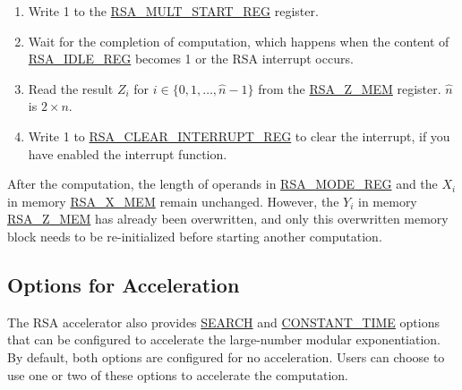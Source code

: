 \documentclass[main\_\_EN.tex]{subfiles}
\begin{document}
\begin{enumerate}
        Users need to write data to each memory block only according to the length of the number; data beyond this length are ignored.
        
    \item Write 1 to the \hyperref[regdesc:RSAMULTSTARTREG]{RSA\_MULT\_START\_REG} register.

    \item Wait for the completion of computation, which happens when the content of \hyperref[regdesc:RSAIDLEREG]{RSA\_IDLE\_REG} becomes 1 or the RSA interrupt occurs.
    
    \item Read the result \begin{math}Z_{i}\end{math}
          for \begin{math}i \in \{ 0, 1, \dots, \hat{n}-1 \} \end{math} from the \hyperref[regdesc:RSAmemory]{RSA\_Z\_MEM} register. 
        \begin{math}\hat{n}\end{math} is \begin{math} 2 \times n \end{math}.

    \item Write 1 to \hyperref[regdesc:RSACLEARINTERRUPTREG]{RSA\_CLEAR\_INTERRUPT\_REG} to clear the interrupt, if you have enabled the interrupt function.

\end{enumerate}

After the computation, the length of operands in \hyperref[regdesc:RSAMODEXPMODEREG]{RSA\_MODE\_REG} and the \begin{math}X_{i}\end{math} in memory \hyperref[regdesc:RSAmemory]{RSA\_X\_MEM} remain unchanged. However, the \begin{math}{Y}_{i}\end{math} in memory \hyperref[regdesc:RSAmemory]{RSA\_Z\_MEM} has already been overwritten, and only this overwritten memory block needs to be re-initialized before starting another computation.
\subsection{Options for Acceleration} \label{sec:Accelerate options}

The \chipname{} RSA accelerator also provides \hyperref[regdesc:RSASEARCHENABLEREG]{SEARCH} and \hyperref[regdesc:RSACONSTANTTIMEREG]{CONSTANT\_TIME} options that can be configured to accelerate the large-number modular exponentiation. By default, both options are configured for no acceleration. Users can choose to use one or two of these options to accelerate the computation.
\end{document}
